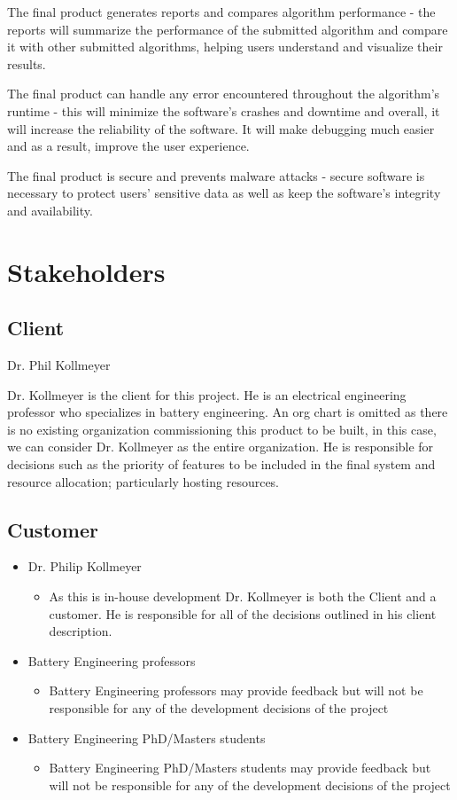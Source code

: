 \documentclass[12pt]{article}
\begin{document}
    The final product generates reports and compares algorithm performance - the reports will summarize the performance of the submitted algorithm and compare it with other submitted algorithms, helping users understand and visualize their results.
    
    The final product can handle any error encountered throughout the algorithm’s runtime - this will minimize the software’s crashes and downtime and overall, it will increase the reliability of the software. It will make debugging much easier and as a result, improve the user experience.
    
    The final product is secure and prevents malware attacks - secure software is necessary to protect users’ sensitive data as well as keep the software’s integrity and availability.

\section{Stakeholders}
\subsection{Client}
Dr. Phil Kollmeyer

Dr. Kollmeyer is the client for this project. He is an electrical engineering professor who specializes in battery engineering. An org chart is omitted as there is no existing organization commissioning this product to be built, in this case, we can consider Dr. Kollmeyer as the entire organization. He is responsible for decisions such as the priority of features to be included in the final system and resource allocation; particularly hosting resources.

\subsection{Customer}
\begin{itemize}
    \item Dr. Philip Kollmeyer
    \begin{itemize} 
        \item As this is in-house development Dr. Kollmeyer is both the Client and a customer. He is responsible for all of the decisions outlined in his client description.
    \end{itemize}
    \item Battery Engineering professors
    \begin{itemize}
        \item Battery Engineering professors may provide feedback but will not be responsible for any of the development decisions of the project
    \end{itemize}
    \item Battery Engineering PhD/Masters students
    \begin{itemize}
        \item Battery Engineering PhD/Masters students may provide feedback but will not be responsible for any of the development decisions of the project
    \end{itemize}
\end{itemize}
\end{document}
